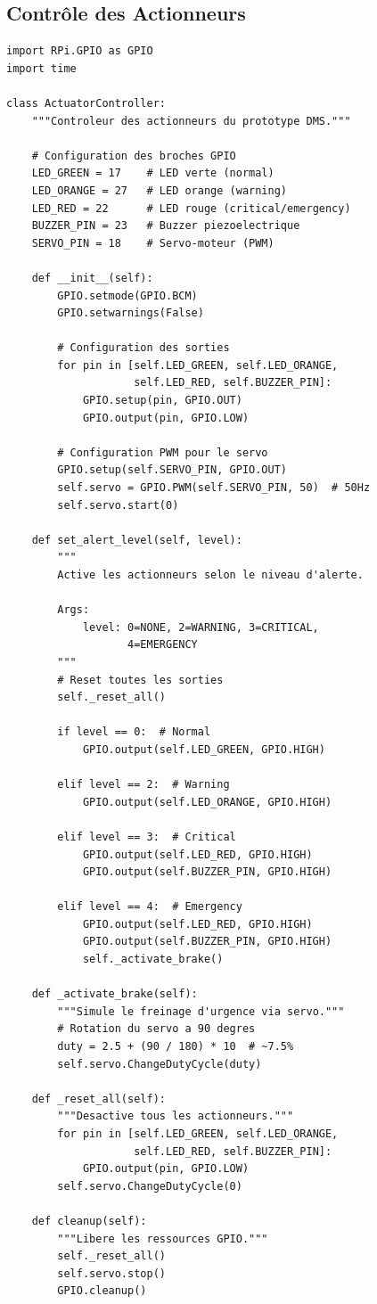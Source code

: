 \subsection{Contrôle des Actionneurs}

\begin{lstlisting}[style=pythonstyle, caption={Contrôle des actionneurs du robot.}, label={lst:actuators}]
import RPi.GPIO as GPIO
import time

class ActuatorController:
    """Controleur des actionneurs du prototype DMS."""
    
    # Configuration des broches GPIO
    LED_GREEN = 17    # LED verte (normal)
    LED_ORANGE = 27   # LED orange (warning)
    LED_RED = 22      # LED rouge (critical/emergency)
    BUZZER_PIN = 23   # Buzzer piezoelectrique
    SERVO_PIN = 18    # Servo-moteur (PWM)
    
    def __init__(self):
        GPIO.setmode(GPIO.BCM)
        GPIO.setwarnings(False)
        
        # Configuration des sorties
        for pin in [self.LED_GREEN, self.LED_ORANGE,
                    self.LED_RED, self.BUZZER_PIN]:
            GPIO.setup(pin, GPIO.OUT)
            GPIO.output(pin, GPIO.LOW)
        
        # Configuration PWM pour le servo
        GPIO.setup(self.SERVO_PIN, GPIO.OUT)
        self.servo = GPIO.PWM(self.SERVO_PIN, 50)  # 50Hz
        self.servo.start(0)
    
    def set_alert_level(self, level):
        """
        Active les actionneurs selon le niveau d'alerte.
        
        Args:
            level: 0=NONE, 2=WARNING, 3=CRITICAL, 
                   4=EMERGENCY
        """
        # Reset toutes les sorties
        self._reset_all()
        
        if level == 0:  # Normal
            GPIO.output(self.LED_GREEN, GPIO.HIGH)
        
        elif level == 2:  # Warning
            GPIO.output(self.LED_ORANGE, GPIO.HIGH)
        
        elif level == 3:  # Critical
            GPIO.output(self.LED_RED, GPIO.HIGH)
            GPIO.output(self.BUZZER_PIN, GPIO.HIGH)
        
        elif level == 4:  # Emergency
            GPIO.output(self.LED_RED, GPIO.HIGH)
            GPIO.output(self.BUZZER_PIN, GPIO.HIGH)
            self._activate_brake()
    
    def _activate_brake(self):
        """Simule le freinage d'urgence via servo."""
        # Rotation du servo a 90 degres
        duty = 2.5 + (90 / 180) * 10  # ~7.5%
        self.servo.ChangeDutyCycle(duty)
    
    def _reset_all(self):
        """Desactive tous les actionneurs."""
        for pin in [self.LED_GREEN, self.LED_ORANGE,
                    self.LED_RED, self.BUZZER_PIN]:
            GPIO.output(pin, GPIO.LOW)
        self.servo.ChangeDutyCycle(0)
    
    def cleanup(self):
        """Libere les ressources GPIO."""
        self._reset_all()
        self.servo.stop()
        GPIO.cleanup()
\end{lstlisting}

